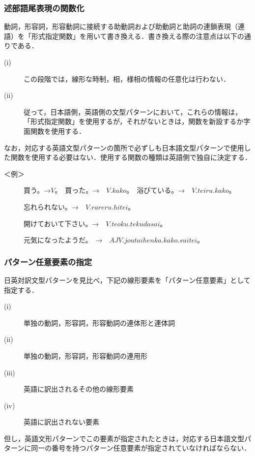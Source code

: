 \documentclass{nlp}
\begin{document}
\subsubsection{述部語尾表現の関数化}
動詞，形容詞，形容動詞に接続する助動詞および助動詞と助詞の連鎖表現（連語）を「形式指定関数」を用いて書き換える．書き換える際の注意点は以下の通りである．

\begin{description}
\item[(i)]この段階では，線形な時制，相，様相の情報の任意化は行わない．
\item[(ii)]従って，日本語側，英語側の文型パターンにおいて，これらの情報は，「形式指定関数」を使用するが，それがないときは，関数を新設するか字面関数を使用する．
\end{description}

なお，対応する英語文型パターンの箇所で必ずしも日本語文型パターンで使用した関数を使用する必要はない．使用する関数の種類は英語側で独自に決定する．

\begin{description}
\item[＜例＞]買う。→$V$。　買った。→　$V.kako$。　浴びている。→　$V.teiru.kako$。

忘れられない。→　$V.rareru.hitei$。　　

開けておいて下さい。→　$V.teoku.tekudasai$。

元気になったようだ。　→　$AJV.joutaihenka.kako.suitei$。
\end{description}

\subsubsection{パターン任意要素の指定}
日英対訳文型パターンを見比べ，下記の線形要素を「パターン任意要素」として指定する．

\begin{description}
\item[(i)]単独の動詞，形容詞，形容動詞の連体形と連体詞
\item[(ii)]単独の動詞，形容詞，形容動詞の連用形
\item[(iii)]英語に訳出されるその他の線形要素
\item[(iv)]英語に訳出されない要素
\end{description}

但し，英語文形パターンでこの要素が指定されたときは，対応する日本語文型パターンに同一の番号を持つパターン任意要素が指定されていなければならない．
\end{document}
